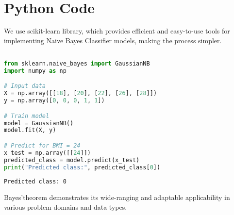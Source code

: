 \documentclass{article}
\begin{document}
\section*{Python Code}
We use scikit-learn library, which provides efficient and easy-to-use tools for implementing Naive Bayes Classifier models, making the process simpler.
\begin{lstlisting}[language=Python, caption={NBC For Continuous Random Variable}]

from sklearn.naive_bayes import GaussianNB
import numpy as np

# Input data
X = np.array([[18], [20], [22], [26], [28]])
y = np.array([0, 0, 0, 1, 1])

# Train model
model = GaussianNB()
model.fit(X, y)

# Predict for BMI = 24
x_test = np.array([[24]])
predicted_class = model.predict(x_test)
print("Predicted class:", predicted_class[0])

\end{lstlisting}

\begin{lstlisting}
Predicted class: 0 
\end{lstlisting}


Bayes'theorem demonstrates its wide-ranging and adaptable applicability in various problem domains and data types.
\end{document}
